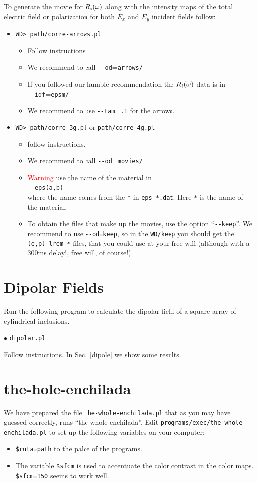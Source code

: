 \documentclass[preprint,12pt]{revtex4}
\def\colore{red}
\begin{document}
To generate the movie for $R_i(\omega)$ along with the intensity maps of
the total electric field or polarization for both $E_x$ and $E_y$ incident fields
follow:
\begin{itemize}
\item \verb=WD> path/corre-arrows.pl=
\begin{itemize}
\item Follow instructions.
\item We recommend to call \verb=--od==\verb=arrows/=
\item If you followed our humble recommendation the $R_i(\omega)$ data is in\\
 \verb=--idf==\verb=epsm/=
\item We recommend to use \verb=--tam==\verb=.1= for the arrows.
\end{itemize}
\item \verb=WD> path/corre-3g.pl= or \verb=path/corre-4g.pl=  
\begin{itemize}
\item follow instructions.
\item We recommend to call \verb=--od==\verb=movies/=
\item \textcolor{\colore}{Warning} use the name of the material in \\
\verb=--eps(a,b)=\\
where the name comes from the \verb=*= in \verb=eps_*.dat=. Here
\verb=*= is the name of the 
material. 
\item To obtain the files that make up the movies, use the option
  ``\Verb+--keep+''. We recommend to use \Verb+--od=keep+, so in the
  \verb=WD/keep= you should get the \verb=(e,p)-lrem_*= 
  files, that you could use at your free will (although with a 300ms
  delay!, free will, of course!).
\end{itemize}
\end{itemize}

\section{Dipolar Fields}
Run the following program to calculate the dipolar field of a square
array of cylindrical inclusions.

$\bullet$ \verb=dipolar.pl=

Follow instructions. In Sec.~\ref{dipole} we show some results.

\section{the-hole-enchilada}\label{sec:enchilada} 
We have prepared the file 
\verb=the-whole-enchilada.pl=  
that as you
may have guessed correctly, runs ``the-whole-enchilada''. 
Edit 
\verb=programs/exec/the-whole-enchilada.pl= 
to set up the following variables on your computer:
\begin{itemize}
\item \Verb+$ruta=path+ to the palce of the programs.
\item The variable \verb=$sfcm= 
is used to accentuate the color
contrast in the color maps. \Verb+$sfcm=150+ seems to work well. 
\end{itemize}
\end{document}
